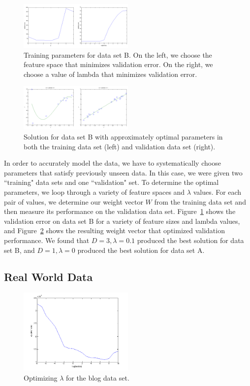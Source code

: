 \documentclass[11pt]{article}   %
\theoremstyle{plain}
\begin{document}
\begin{figure}[h!]\label{fig-training}
  \caption{Training parameters for data set B. On the left, we choose the feature space that minimizes validation error. On the right, we choose a value of lambda that minimizes validation error. }
  \centering
    \includegraphics[width=0.5\textwidth]{figures/3_2_training.png}
\end{figure}

\begin{figure}[h!]\label{fig-result}
  \caption{ Solution  for data set B with approximately optimal parameters in both the training data set (left) and validation data set (right). }
  \centering
    \includegraphics[width=0.5\textwidth]{figures/3_2_result.png}
\end{figure}

In order to accurately model the data, we have to systematically choose parameters that satisfy previously unseen data. In this case, we were given two ``training" data sets and one ``validation" set. To determine the optimal parameters, we loop through a variety of feature spaces and $\lambda$ values. For each pair of values, we determine our weight vector $W$ from the training data set and then measure its performance on the validation data set. Figure~\ref{fig-training} shows the validation error on data set B for a variety of feature sizes and lambda values, and Figure~\ref{fig-result} shows the resulting weight vector that optimized validation performance. We found that $D=3, \lambda=0.1$ produced the best solution for data set B, and $D=1,\lambda=0$ produced the best solution for data set A.
\subsection{Real World Data}
\begin{figure}[h!]\label{fig-blog}
  \caption{ Optimizing $\lambda$ for the blog data set. }
  \centering
    \includegraphics[width=0.5\textwidth]{figures/3_3_choosing_lambda.png}
\end{figure}
\end{document}
